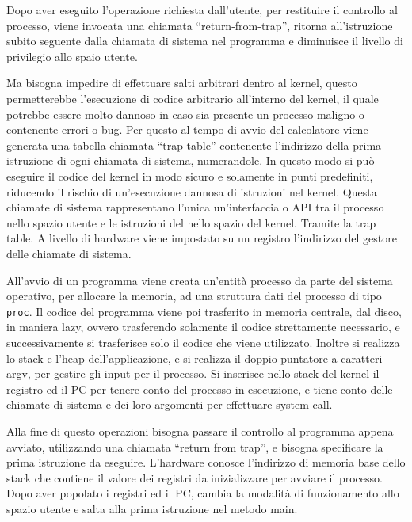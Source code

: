 \documentclass{article}
\numberwithin{equation}{subsection}
\begin{document}
Dopo aver eseguito l'operazione richiesta dall'utente, per restituire il controllo al processo, viene invocata una chiamata ``return-from-trap'', ritorna all'istruzione 
subito seguente dalla chiamata di sistema nel programma e diminuisce il livello di privilegio allo spaio utente. 

Ma bisogna impedire di effettuare salti arbitrari dentro al kernel, questo permetterebbe l'esecuzione di codice arbitrario all'interno del kernel, il quale potrebbe 
essere molto dannoso in caso sia presente un processo maligno o contenente errori o bug. Per questo al tempo di avvio del calcolatore viene generata una tabella 
chiamata ``trap table'' contenente l'indirizzo della prima istruzione di ogni chiamata di sistema, numerandole. 
In questo modo si può eseguire il codice del kernel in modo sicuro e solamente in punti predefiniti, riducendo il rischio di un'esecuzione dannosa di istruzioni nel 
kernel. 
Questa chiamate di sistema rappresentano l'unica un'interfaccia o API tra il processo nello spazio utente e le istruzioni del nello spazio del kernel. Tramite la 
trap table. 
A livello di hardware viene impostato su un registro l'indirizzo del gestore delle chiamate di sistema. 


All'avvio di un programma viene creata un'entità processo da parte del sistema operativo, per allocare la memoria, ad una struttura dati del processo di tipo \verb|proc|. 
Il codice del programma viene poi trasferito in memoria centrale, dal disco, in maniera lazy, ovvero trasferendo solamente il codice strettamente 
necessario, e successivamente si trasferisce solo il codice che viene utilizzato. 
Inoltre si realizza lo stack e l'heap dell'applicazione, e si realizza il doppio puntatore a caratteri argv, per gestire gli input per il processo. Si inserisce nello 
stack del kernel il registro ed il PC per tenere conto del processo in esecuzione, e tiene conto delle chiamate di sistema e dei loro argomenti per effettuare system call. 

Alla fine di questo operazioni bisogna passare il controllo al programma appena avviato, utilizzando una chiamata ``return from trap'', e bisogna specificare la prima 
istruzione da eseguire. L'hardware conosce l'indirizzo di memoria base dello stack che contiene il valore dei registri da inizializzare per avviare il processo. Dopo 
aver popolato i registri ed il PC, cambia la modalità di funzionamento allo spazio utente e salta alla prima istruzione nel metodo main. 
\end{document}

